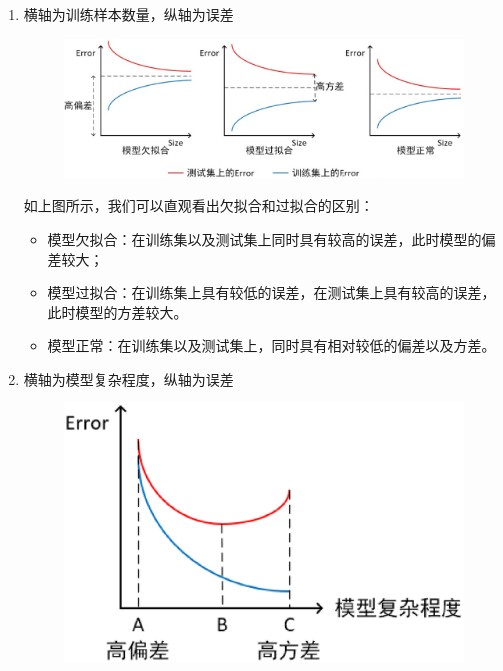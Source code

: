 \begin{enumerate}
	\itemsep0em 
	\item 横轴为训练样本数量，纵轴为误差

		\begin{figure}[h]
			\centering
			\includegraphics[width=.9\textwidth]{imgs/2.16.4.1.eps}
			\label{fig:2.16.4.1}
		\end{figure}

		如上图所示，我们可以直观看出欠拟合和过拟合的区别：

		\begin{itemize}
			\itemsep0em 
			\item 模型欠拟合：在训练集以及测试集上同时具有较高的误差，此时模型的偏差较大；
			\item 模型过拟合：在训练集上具有较低的误差，在测试集上具有较高的误差，此时模型的方差较大。
			\item 模型正常：在训练集以及测试集上，同时具有相对较低的偏差以及方差。
		\end{itemize}

	\item 横轴为模型复杂程度，纵轴为误差

		\begin{figure}[h]
			\centering
			\includegraphics[width=.9\textwidth]{imgs/2.16.4.2.eps}
			\label{fig:2.16.4.1}
		\end{figure}


\end{enumerate}
